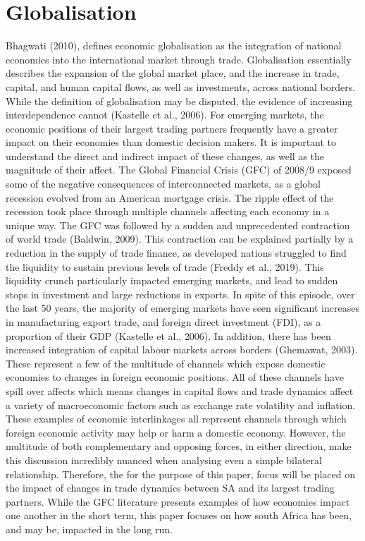 \documentclass[11pt,preprint, authoryear]{elsarticle}
\numberwithin{equation}{section}
\numberwithin{figure}{section}
\numberwithin{table}{section}
\begin{document}
\hypertarget{globalisation}{%
\section{\texorpdfstring{Globalisation
\label{Globalisation}}{Globalisation }}\label{globalisation}}

Bhagwati (2010), defines economic globalisation as the integration of
national economies into the international market through trade.
Globalisation essentially describes the expansion of the global market
place, and the increase in trade, capital, and human capital flows, as
well as investments, across national borders. While the definition of
globalisation may be disputed, the evidence of increasing
interdependence cannot (Kastelle et al., 2006). For emerging markets,
the economic positions of their largest trading partners frequently have
a greater impact on their economies than domestic decision makers. It is
important to understand the direct and indirect impact of these changes,
as well as the magnitude of their affect. The Global Financial Crisis
(GFC) of 2008/9 exposed some of the negative consequences of
interconnected markets, as a global recession evolved from an American
mortgage crisis. The ripple effect of the recession took place through
multiple channels affecting each economy in a unique way. The GFC was
followed by a sudden and unprecedented contraction of world trade
(Baldwin, 2009). This contraction can be explained partially by a
reduction in the supply of trade finance, as developed nations struggled
to find the liquidity to sustain previous levels of trade (Freddy et
al., 2019). This liquidity crunch particularly impacted emerging
markets, and lead to sudden stops in investment and large reductions in
exports. In spite of this episode, over the last 50 years, the majority
of emerging markets have seen significant increases in manufacturing
export trade, and foreign direct investment (FDI), as a proportion of
their GDP (Kastelle et al., 2006). In addition, there has been increased
integration of capital labour markets across borders (Ghemawat, 2003).
These represent a few of the multitude of channels which expose domestic
economies to changes in foreign economic positions. All of these
channels have spill over affects which means changes in capital flows
and trade dynamics affect a variety of macroeconomic factors such as
exchange rate volatility and inflation. These examples of economic
interlinkages all represent channels through which foreign economic
activity may help or harm a domestic economy. However, the multitude of
both complementary and opposing forces, in either direction, make this
discussion incredibly nuanced when analysing even a simple bilateral
relationship. Therefore, the for the purpose of this paper, focus will
be placed on the impact of changes in trade dynamics between SA and its
largest trading partners. While the GFC literature presents examples of
how economies impact one another in the short term, this paper focuses
on how south Africa has been, and may be, impacted in the long run.
\end{document}
